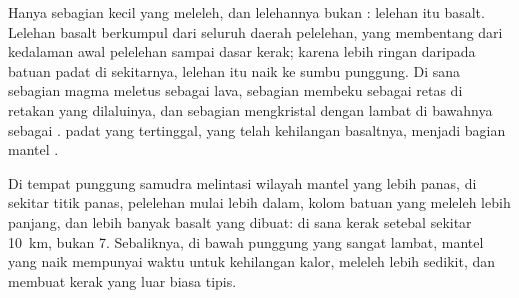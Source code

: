 Hanya sebagian kecil  yang meleleh, dan lelehannya bukan :
lelehan itu basalt. Lelehan basalt berkumpul dari seluruh daerah pelelehan, yang
membentang dari kedalaman awal pelelehan sampai dasar kerak; karena lebih ringan
daripada batuan padat di sekitarnya, lelehan itu naik ke sumbu punggung. Di sana
sebagian magma meletus sebagai lava, sebagian membeku sebagai retas di retakan
yang dilaluinya, dan sebagian mengkristal dengan lambat di bawahnya sebagai
.  padat yang tertinggal, yang telah kehilangan basaltnya, menjadi
bagian mantel .

Di tempat punggung samudra melintasi wilayah mantel yang lebih panas, di sekitar
titik panas, pelelehan mulai lebih dalam, kolom batuan yang meleleh lebih
panjang, dan lebih banyak basalt yang dibuat: di sana kerak setebal sekitar
\qty{10}{km}, bukan 7. Sebaliknya, di bawah punggung yang sangat lambat, mantel
yang naik mempunyai waktu untuk kehilangan kalor, meleleh lebih sedikit, dan
membuat kerak yang luar biasa tipis.

